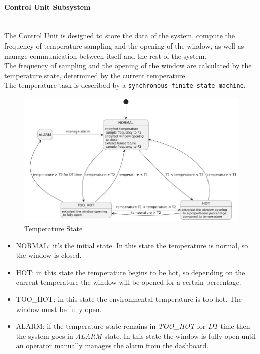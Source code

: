 \documentclass[a4paper,12pt]{report}
\begin{document}
            \newpage
            \paragraph{Control Unit Subsystem\\}
                \ \\
                The Control Unit is designed to store the data of the system, compute the frequency of temperature sampling and the opening 
                of the window, as well as manage communication between itself and the rest of the system.\\
                The frequency of sampling and the opening of the window are calculated by the temperature state, determined by the current 
                temperature.\\
                The temperature task is described by a \texttt{synchronous finite state machine}. 
    
                \begin{figure}[H]
                    \centering{}
                    \includegraphics[width=\textwidth]{uml/img/TemperatureStateUML.png}
                    \caption{Temperature State}
                    \label{img:temperature_state}
                \end{figure}
    
                \begin{itemize}
                    \item NORMAL: it's the initial state. In this state the temperature is normal, so the window is closed.
                    \item HOT: in this state the temperature begins to be hot, so depending on the current temperature the window will be 
                    opened for a certain percentage.
                    \item TOO\_HOT: in this state the environmental temperature is too hot. The window must be fully open.
                    \item ALARM: if the temperature state remains in \textit{TOO\_HOT} for $DT$ time then the system goes in \textit{ALARM} 
                    state. In this state the window is fully open until an operator manually manages the alarm from the dashboard.
                \end{itemize}

    
\end{document}
